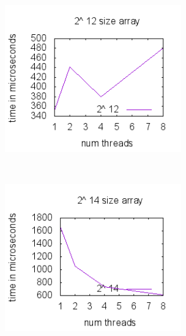 \documentclass{article} %
\begin{document}
\noindent \includegraphics*[scale = 0.5, bb=0 0 3in 3in, width=3in, height=3in, keepaspectratio=true]{out12.png}\includegraphics*[scale = 0.5, bb=0 0 3.21in 3in, width=3in, height=3in, keepaspectratio=true]{out14.png}
\end{document}
